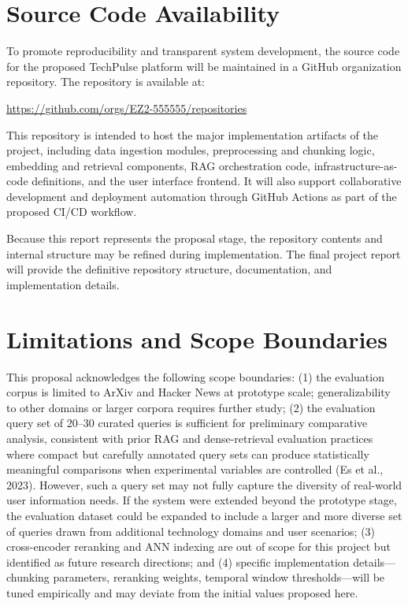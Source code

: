 \documentclass[12pt,a4paper]{report}
\begin{document}
\section{Source Code Availability}
\label{sec:code_availability}

To promote reproducibility and transparent system development, the source code for the proposed TechPulse platform will be maintained in a GitHub organization repository. The repository is available at:

\begin{center}
\url{https://github.com/orgs/EZ2-555555/repositories}
\end{center}

This repository is intended to host the major implementation artifacts of the project, including data ingestion modules, preprocessing and chunking logic, embedding and retrieval components, RAG orchestration code, infrastructure-as-code definitions, and the user interface frontend. It will also support collaborative development and deployment automation through GitHub Actions as part of the proposed CI/CD workflow.

Because this report represents the proposal stage, the repository contents and internal structure may be refined during implementation. The final project report will provide the definitive repository structure, documentation, and implementation details.


\section{Limitations and Scope Boundaries}
\label{sec:limitations}

This proposal acknowledges the following scope boundaries: (1) the evaluation corpus is limited to ArXiv and Hacker News at prototype scale; generalizability to other domains or larger corpora requires further study; (2) the evaluation query set of 20–30 curated queries is sufficient for preliminary comparative analysis, consistent with prior RAG and dense-retrieval evaluation practices where compact but carefully annotated query sets can produce statistically meaningful comparisons when experimental variables are controlled (Es et al., 2023). However, such a query set may not fully capture the diversity of real-world user information needs. If the system were extended beyond the prototype stage, the evaluation dataset could be expanded to include a larger and more diverse set of queries drawn from additional technology domains and user scenarios; (3) cross-encoder reranking and ANN indexing are out of scope for this project but identified as future research directions; and (4) specific implementation details—chunking parameters, reranking weights, temporal window thresholds—will be tuned empirically and may deviate from the initial values proposed here.
\end{document}
